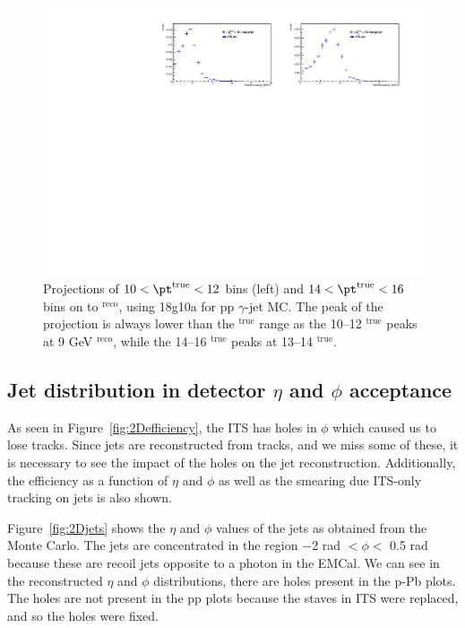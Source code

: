 \begin{figure}[h]
\center
\includegraphics[height=0.45\textwidth, width=1.\textwidth]{JetResponse/fulljet_projections-10-14_pp.pdf}
\caption{Projections of $10 < \pt^{\mathrm{true}} < 12$ \GeVc bins (left) and $14 < \pt^{\mathrm{true}} < 16$ \GeVc bins on to \pt$^{\mathrm{reco}}$, using 18g10a for pp $\gamma$-jet MC. The peak of the projection is always lower than the \pt$^{\mathrm{true}}$ range as the 10--12 \GeVc \pt$^{\mathrm{true}}$ peaks at 9 GeV \pt$^{\mathrm{reco}}$, while the 14--16 \GeVc \pt$^{\mathrm{true}}$ peaks at 13--14 \GeVc \pt$^{\mathrm{true}}$.}  
\label{fig:jetResonseProjections}
\end{figure}

\subsection{Jet distribution in detector $\eta$ and $\phi$ acceptance}
As seen in Figure~\ref{fig:2Defficiency}, the ITS has holes in $\phi$ which caused us to lose tracks. Since jets are reconstructed from tracks, and we miss some of these, it is necessary to see the impact of the holes on the jet reconstruction. Additionally, the efficiency as a function of $\eta$ and $\phi$ as well as the smearing due ITS-only tracking on jets is also shown. 

Figure~\ref{fig:2Djets} shows the $\eta$ and $\phi$ values of the jets as obtained from the Monte Carlo. The jets are concentrated in the region $-$2 rad $< \phi <$ 0.5 rad because these are recoil jets opposite to a photon in the EMCal. We can see in the reconstructed $\eta$ and $\phi$ distributions, there are holes present in the p-Pb plots. The holes are not present in the pp plots because the staves in ITS were replaced, and so the holes were fixed. 


